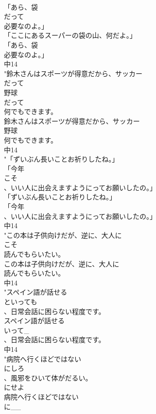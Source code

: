 \documentclass[8pt]{extreport}
\begin{document}
\begin{CJK}{UTF8}{min}
\\	「あら、袋
\\	だって
\\	必要なのよ。」
\\	「ここにあるスーパーの袋の山、何だよ。」
\\	「あら、袋
\\	必要なのよ。」
\\	中14
\\	"鈴木さんはスポーツが得意だから、サッカー
\\	だって
\\	野球
\\	だって
\\	何でもできます。
\\	鈴木さんはスポーツが得意だから、サッカー
\\	野球
\\	何でもできます。
\\	中14
\\	"「ずいぶん長いことお祈りしたね。」
\\	「今年
\\	こそ
\\	、いい人に出会えますようにってお願いしたの。」
\\	「ずいぶん長いことお祈りしたね。」
\\	「今年
\\	、いい人に出会えますようにってお願いしたの。」
\\	中14
\\	"この本は子供向けだが、逆に、大人に
\\	こそ
\\	読んでもらいたい。
\\	この本は子供向けだが、逆に、大人に
\\	読んでもらいたい。
\\	中14
\\	"スペイン語が話せる
\\	といっても
\\	、日常会話に困らない程度です。
\\	スペイン語が話せる
\\	いって_
\\	、日常会話に困らない程度です。
\\	中14
\\	"病院へ行くほどではない
\\	にしろ
\\	、風邪をひいて体がだるい。
\\	にせよ
\\	病院へ行くほどではない
\\	に__

\end{CJK}
\end{document}
